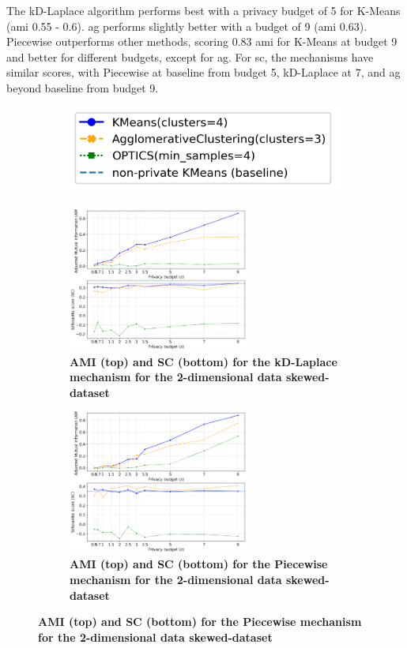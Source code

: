 The kD-Laplace algorithm performs best with a privacy budget of 5 for K-Means (\gls{ami} 0.55 - 0.6).
\gls{ag} performs slightly better with a budget of 9 (\gls{ami} 0.63).
Piecewise outperforms other methods, scoring 0.83 \gls{ami} for K-Means at budget 9 and better for different budgets, except for \gls{ag}.
For \gls{sc}, the mechanisms have similar scores, with Piecewise at baseline from budget 5, kD-Laplace at 7, and \gls{ag} beyond baseline from budget 9.

\newpage
\begin{figure}[H]
  \centering
  \begin{subfigure}{0.3\textwidth}
    \includegraphics[width=\textwidth]{Results/kd-laplace/kd-Laplace/skewed-dataset/legend_2.png}
  \end{subfigure}
  \begin{subfigure}{1\textwidth}
    \centering
    \caption{\textbf{AMI (top) and SC (bottom) for the kD-Laplace mechanism for the 2-dimensional data skewed-dataset}}
    \includegraphics[width=0.65\textwidth]{Results/kd-laplace/kd-Laplace/skewed-dataset/ami-and-sc_2_dimensions.png}
    \centering
  \end{subfigure}
  \begin{subfigure}{1\textwidth}
    \centering
    \caption{\textbf{AMI (top) and SC (bottom) for the Piecewise mechanism for the 2-dimensional data skewed-dataset}}
    \includegraphics[width=0.65\textwidth]{Results/kd-laplace/piecewise/skewed-dataset/ami-and-sc_2_dimensions.png}

\end{subfigure}
\end{figure}
